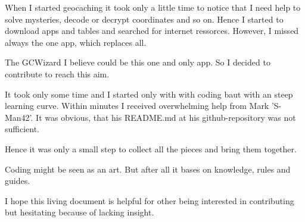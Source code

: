 
When I started geocaching it took only a little time to notice that I need help to solve mysteries, decode or decrypt coordinates and so on. Hence I started to download apps and tables and searched for internet ressorces. However, I missed always the one app, which replaces all.

The GCWizard I believe could be this one and only app. So I decided to contribute to reach this aim.

It took only some time and I started only with with coding baut with an steep learning curve. Within minutes I received overwhelming help from Mark 'S-Man42'. It was obvious, that his README.md at his github-repository was not sufficient.

Hence it was only a small step to collect all the pieces and bring them together.

Coding might be seen as an art. But after all it bases on knowledge, rules and guides.

I hope this living document is helpful for other being interested in contributing but hesitating because of lacking insight.
